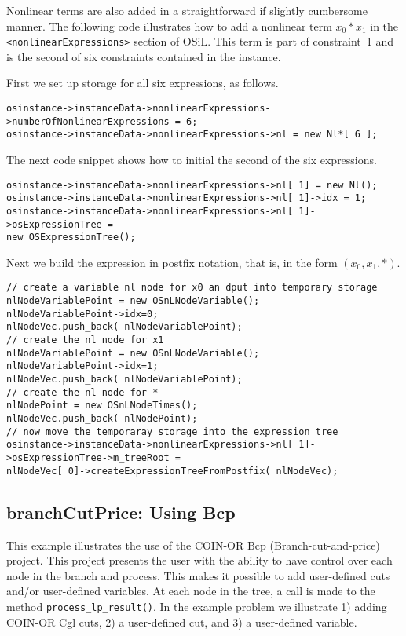 \documentclass[11pt]{article}
\renewcommand{\{}{{\char"7B}}
\renewcommand{\}}{{\char"7D}}
\renewcommand{\^}{{\char"0D}}
\renewcommand{\'}{{\char"0D}}
\begin{document}
Nonlinear terms are also added in a straightforward if slightly cumbersome manner.   
The following code illustrates how to add a nonlinear term $x_{0}*x_{1}$ in the 
{\tt <nonlinearExpressions>} section of  OSiL. This term is part of constraint~1
and is the second of six constraints contained in the instance. 

First we set up storage for all six expressions, as follows.

\begin{verbatim}
osinstance->instanceData->nonlinearExpressions->numberOfNonlinearExpressions = 6;
osinstance->instanceData->nonlinearExpressions->nl = new Nl*[ 6 ];
\end{verbatim}

The next code snippet shows how to initial the second of the six expressions.

\begin{verbatim}
osinstance->instanceData->nonlinearExpressions->nl[ 1] = new Nl();
osinstance->instanceData->nonlinearExpressions->nl[ 1]->idx = 1;
osinstance->instanceData->nonlinearExpressions->nl[ 1]->osExpressionTree =
new OSExpressionTree();
\end{verbatim}

Next we build the expression in postfix notation, that is, in the form $(x_0, x_1, *)$.

\begin{verbatim}
// create a variable nl node for x0 an dput into temporary storage
nlNodeVariablePoint = new OSnLNodeVariable();
nlNodeVariablePoint->idx=0;
nlNodeVec.push_back( nlNodeVariablePoint);
// create the nl node for x1
nlNodeVariablePoint = new OSnLNodeVariable();
nlNodeVariablePoint->idx=1;
nlNodeVec.push_back( nlNodeVariablePoint);
// create the nl node for *
nlNodePoint = new OSnLNodeTimes();
nlNodeVec.push_back( nlNodePoint);
// now move the temporaray storage into the expression tree
osinstance->instanceData->nonlinearExpressions->nl[ 1]->osExpressionTree->m_treeRoot =
nlNodeVec[ 0]->createExpressionTreeFromPostfix( nlNodeVec);
\end{verbatim}





\subsection{branchCutPrice:  Using Bcp}\label{section:examplebranchCutPrice}

This example illustrates the use of the COIN-OR Bcp (Branch-cut-and-price) project.  
This project presents the user with the ability to have control over each node in the branch and process. 
This makes it possible to add user-defined cuts and/or user-defined variables. 
At each node in the tree, a call is made to the method {\tt process\_lp\_result()}. 
In the example problem we illustrate 1) adding COIN-OR Cgl cuts, 2) a user-defined cut, 
and 3) a user-defined variable. 
\end{document}
